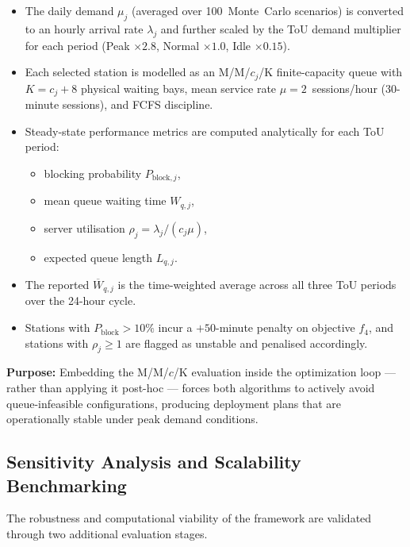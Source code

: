 \begin{itemize}
    \item The daily demand $\mu_j$ (averaged over 100~Monte~Carlo
          scenarios) is converted to an hourly arrival rate
          $\lambda_j$ and further scaled by the ToU demand
          multiplier for each period (Peak $\times 2.8$,
          Normal $\times 1.0$, Idle $\times 0.15$).
    \item Each selected station is modelled as an M/M/$c_j$/K
          finite-capacity queue with $K = c_j + 8$ physical
          waiting bays, mean service rate $\mu = 2$~sessions/hour
          (30-minute sessions), and FCFS discipline.
    \item Steady-state performance metrics are computed analytically
          for each ToU period:
          \begin{itemize}
              \item blocking probability $P_{\text{block},j}$,
              \item mean queue waiting time $W_{q,j}$,
              \item server utilisation $\rho_j = \lambda_j / (c_j\mu)$,
              \item expected queue length $L_{q,j}$.
          \end{itemize}
    \item The reported $\overline{W}_{q,j}$ is the time-weighted
          average across all three ToU periods over the 24-hour
          cycle.
    \item Stations with $P_{\text{block}} > 10\%$ incur a
          $+50$-minute penalty on objective $f_4$, and stations
          with $\rho_j \geq 1$ are flagged as unstable and
          penalised accordingly.
\end{itemize}

\noindent\textbf{Purpose:} Embedding the M/M/$c$/K evaluation
inside the optimization loop --- rather than applying it
post-hoc --- forces both algorithms to actively avoid
queue-infeasible configurations, producing deployment plans
that are operationally stable under peak demand conditions.

\subsection{Sensitivity Analysis and Scalability Benchmarking}
The robustness and computational viability of the framework are
validated through two additional evaluation stages.

